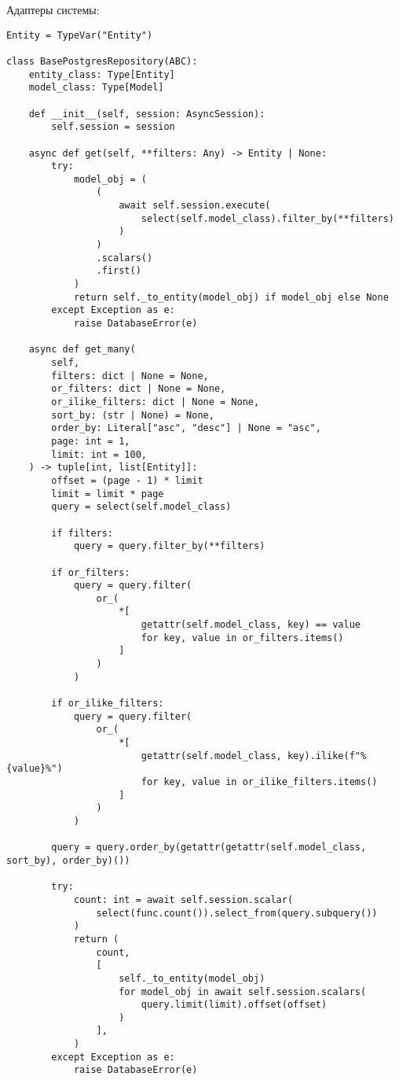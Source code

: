 \noindent
Адаптеры системы:

\begin{lstlisting}[style=pythonstyle]
Entity = TypeVar("Entity")

class BasePostgresRepository(ABC):
    entity_class: Type[Entity]
    model_class: Type[Model]

    def __init__(self, session: AsyncSession):
        self.session = session

    async def get(self, **filters: Any) -> Entity | None:
        try:
            model_obj = (
                (
                    await self.session.execute(
                        select(self.model_class).filter_by(**filters)
                    )
                )
                .scalars()
                .first()
            )
            return self._to_entity(model_obj) if model_obj else None
        except Exception as e:
            raise DatabaseError(e)

    async def get_many(
        self,
        filters: dict | None = None,
        or_filters: dict | None = None,
        or_ilike_filters: dict | None = None,
        sort_by: (str | None) = None,
        order_by: Literal["asc", "desc"] | None = "asc",
        page: int = 1,
        limit: int = 100,
    ) -> tuple[int, list[Entity]]:
        offset = (page - 1) * limit
        limit = limit * page
        query = select(self.model_class)

        if filters:
            query = query.filter_by(**filters)

        if or_filters:
            query = query.filter(
                or_(
                    *[
                        getattr(self.model_class, key) == value
                        for key, value in or_filters.items()
                    ]
                )
            )

        if or_ilike_filters:
            query = query.filter(
                or_(
                    *[
                        getattr(self.model_class, key).ilike(f"%{value}%")
                        for key, value in or_ilike_filters.items()
                    ]
                )
            )

        query = query.order_by(getattr(getattr(self.model_class, sort_by), order_by)())

        try:
            count: int = await self.session.scalar(
                select(func.count()).select_from(query.subquery())
            )
            return (
                count,
                [
                    self._to_entity(model_obj)
                    for model_obj in await self.session.scalars(
                        query.limit(limit).offset(offset)
                    )
                ],
            )
        except Exception as e:
            raise DatabaseError(e)


\end{lstlisting}
